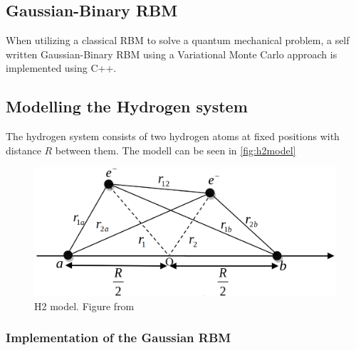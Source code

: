 \documentclass[../main.tex]{subfiles}
\begin{document}
\subsection{Gaussian-Binary RBM}
When utilizing a classical RBM to solve a quantum mechanical problem, a self written Gaussian-Binary RBM using a Variational Monte Carlo approach is implemented using C++.

\subsection{Modelling the Hydrogen system}
The hydrogen system consists of two hydrogen atoms at fixed positions with distance $R$ between them. The modell can be seen in \autoref{fig:h2model}

\begin{figure}[ht]
    \begin{center}
        \includegraphics[scale=0.15]{figures/perfect.png}
        \caption{H2 model. Figure from \cite{hydrogen_model_figure}}
        \label{fig:h2model}
    \end{center}
\end{figure}

\subsubsection{Implementation of the Gaussian RBM}
\end{document}
